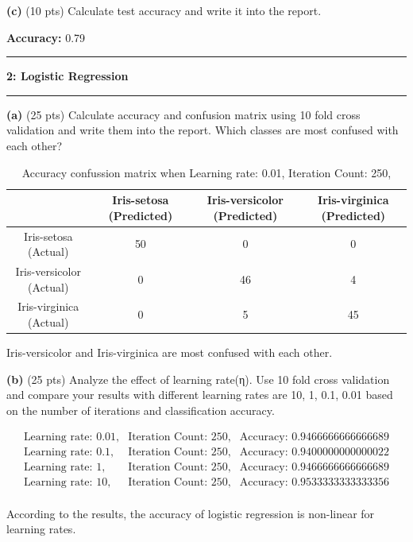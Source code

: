 \documentclass[11pt]{article}
\newcommand\tab[1][1cm]{\hspace*{#1}}
\newcommand\question[2]{\vspace{.25in}\hrule\textbf{#1: #2}\vspace{.5em}\hrule\vspace{.10in}}
\renewcommand\part[1]{\vspace{.10in}\textbf{(#1)}}
\begin{document}
\part{c} (10 pts) Calculate test accuracy and write it into the report.

\tab \textbf{Accuracy:} 0.79

\question{2}{Logistic Regression}

\part{a} (25 pts) Calculate accuracy and confusion matrix using 10 fold cross validation and write them into the report. Which classes are most confused with each other?

\begin{table}[h]
	\centering
	\caption{Accuracy confussion matrix when Learning rate: 0.01, Iteration Count: 250,}
	\label{my-label}
	\begin{tabular}{|c|c|c|c|}
		\hline
		& Iris-setosa (Predicted) & Iris-versicolor (Predicted) & Iris-virginica (Predicted) \\ \hline
		Iris-setosa (Actual)     & 50                      & 0                           & 0                          \\ \hline
		Iris-versicolor (Actual) & 0                       & 46                          & 4                          \\ \hline
		Iris-virginica (Actual)  & 0                       & 5                           & 45                         \\ \hline
	\end{tabular}
\end{table}

Iris-versicolor and Iris-virginica are most confused with each other.

\part{b} (25 pts) Analyze the effect of learning rate(η). Use 10 fold cross validation and compare your results with different learning rates are 10, 1, 0.1, 0.01 based on the number of iterations and classification accuracy.

\begin{eqnarray*}
\text{Learning rate: 0.01}, & \text{Iteration Count: 250},& \text{Accuracy: 0.9466666666666689} \\
\text{Learning rate: 0.1}, &\text{Iteration Count: 250},& \text{Accuracy: 0.9400000000000022} \\
\text{Learning rate: 1}, &\text{Iteration Count: 250},& \text{Accuracy: 0.9466666666666689} \\
\text{Learning rate: 10}, &\text{Iteration Count: 250},& \text{Accuracy: 0.9533333333333356} \\
\end{eqnarray*}

According to the results, the accuracy of logistic regression is non-linear for learning rates.
\end{document}
